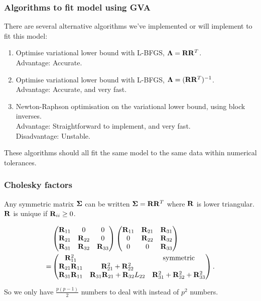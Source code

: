 \documentclass{beamer}
\begin{document}
\begin{frame}
\frametitle{Algorithms to fit model using GVA}
There are several alternative algorithms we've implemented or will implement
to fit this model:
\begin{enumerate}
\item Optimise variational lower bound with L-BFGS, ${\boldsymbol \Lambda} = {\bf R} {\bf R}^T$.\\
\quad Advantage: Accurate.
\item Optimise variational lower bound with L-BFGS, ${\boldsymbol \Lambda} = ({\bf R} {\bf R}^T)^{-1}$. \\
\quad Advantage: Accurate, and very fast.
\item Newton-Raphson optimisation on the variational lower bound, using block inverses. \\
\quad Advantage: Straightforward to implement, and very fast. \\
\quad Disadvantage: Unstable.
\end{enumerate}

These algorithms should all fit the same model to the same data
within numerical tolerances.
\end{frame}

\begin{frame}
\frametitle{Cholesky factors}
Any symmetric matrix ${\boldsymbol \Sigma}$ can be written ${\boldsymbol \Sigma} = {\bf R} {\bf R}^T$
where ${\bf R}$ is lower triangular. ${\bf R}$ is unique if ${\bf R}_{ii} \geq 0$.

\begin{align*}
&\begin{pmatrix}
{\bf R}_{11} & 0 & 0 \\
{\bf R}_{21} & {\bf R}_{22} & 0 \\
{\bf R}_{31} & {\bf R}_{32} & {\bf R}_{33}
\end{pmatrix}
\begin{pmatrix}
{\bf R}_{11} & {\bf R}_{21} & {\bf R}_{31} \\
0 & {\bf R}_{22} & {\bf R}_{32} \\
0 & 0 & {\bf R}_{33}
\end{pmatrix}
\\
=& \begin{pmatrix}
{\bf R}_{11}^2 & & \text{symmetric}\\
{\bf R}_{21}{\bf R}_{11} & {\bf R}_{21}^2 + {\bf R}_{22}^2 \\
{\bf R}_{31} {\bf R}_{11} & {\bf R}_{31}{\bf R}_{21} + {\bf R}_{32}L_{22} & {\bf R}_{31}^2 + {\bf R}_{32} ^2 + {\bf R}_{33}^2
\end{pmatrix}.
\end{align*}

So we only have $\frac{p(p-1)}{2}$ numbers to deal with instead of
$p^2$ numbers.

\end{frame}
\end{document}

